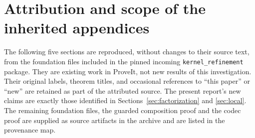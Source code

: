 \documentclass[11pt,letterpaper]{article}
\theoremstyle{definition}\newtheorem{definition}[theorem]{Definition}
\theoremstyle{remark}\newtheorem{remark}[theorem]{Remark}
\begin{document}
\section*{Attribution and scope of the inherited appendices}
The following five sections are reproduced, without changes to their
source text, from the foundation files included in the pinned incoming
\texttt{kernel\_refinement} package. They are existing work in ProveIt,
not new results of this investigation. Their original labels, theorem
titles, and occasional references to ``this paper'' or ``new'' are
retained as part of the attributed source. The present report's new
claims are exactly those identified in Sections~\ref{sec:factorization}
and \ref{sec:local}. The remaining foundation files, the guarded
composition proof and the codec proof are supplied as source artifacts
in the archive and are listed in the provenance map.






\end{document}

